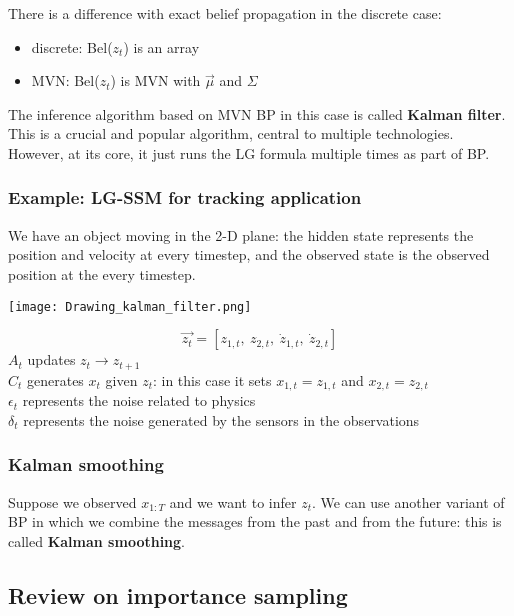 \documentclass{article}
\begin{document}
There is a difference with exact belief propagation in the discrete case:
\begin{itemize}
    \item discrete: Bel($z_t$) is an array
    \item MVN: Bel($z_t$) is MVN with $\vec{\mu}$ and $\Sigma$
\end{itemize}

The inference algorithm based on MVN BP in this case is called \textbf{Kalman filter}. 
This is a crucial and popular algorithm, central to multiple technologies. However, at its core, it just runs the LG formula multiple times as part of BP. 

\subsubsection{Example: LG-SSM for tracking application}

We have an object moving in the 2-D plane: the hidden state represents the position and velocity at every timestep, and the observed state is the observed position at the every timestep.

\begin{center}
\texttt{[image: Drawing\_kalman\_filter.png]}
\end{center}

\[ \vec{z_t} = [ z_{1, t},~z_{2, t},~\dot{z}_{1, t},~\dot{z}_{2, t}] \]
$A_t$ updates $z_t \rightarrow z_{t+1}$\\
$C_t$ generates $x_t$ given $z_t$: in this case it sets $x_{1, t} = z_{1, t}$ and $x_{2, t} = z_{2, t}$\\
$\epsilon_t$ represents the noise related to physics\\
$\delta_t$ represents the noise generated by the sensors in the observations\\

\subsubsection{Kalman smoothing}
Suppose we observed $x_{1:T}$ and we want to infer $z_t$. We can use another variant of BP in which we combine the messages from the past and from the future: this is called \textbf{Kalman smoothing}.


\subsection{Review on importance sampling}
\end{document}
